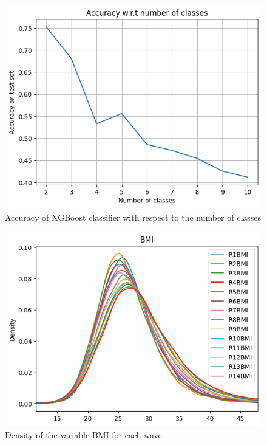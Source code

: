 \documentclass[]{article}
\begin{document}
\begin{figure}[!h]
\centering
\includegraphics[scale=0.75]{xgboost_accuracy_wrt_number_of_classes.png}
\caption{Accuracy of XGBoost classifier with respect to the number of classes}
\label{xgboost_accuracy}
\end{figure}
\begin{figure}[!h]
	\centering
	\includegraphics[scale = 0.75]{density_bmi.png}
	\caption{Density of the variable BMI for each wave}
	\label{density_bmi}
\end{figure}
\end{document}
